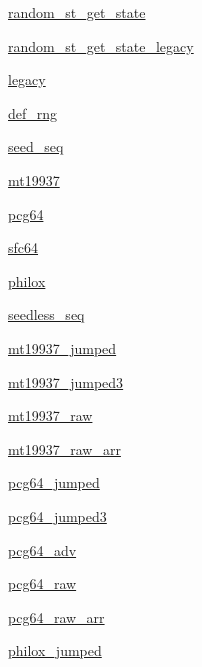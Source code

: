 \begin{DoxyCompactItemize}
\item 
\hyperlink{namespacerandom_a240e2a282437f5bcaeb580df759c2451}{random\+\_\+st\+\_\+get\+\_\+state}
\item 
\hyperlink{namespacerandom_a084d4490674bf3b4e3980d24339d6994}{random\+\_\+st\+\_\+get\+\_\+state\+\_\+legacy}
\item 
\hyperlink{namespacerandom_acca054ac4cb341e38dce9c91e10fac49}{legacy}
\item 
\hyperlink{namespacerandom_a2c6973fc8c41fc3646745e5e16263e4b}{def\+\_\+rng}
\item 
\hyperlink{namespacerandom_a53e5e0b7366478de3058145611394a8b}{seed\+\_\+seq}
\item 
\hyperlink{namespacerandom_a0777bc6c21283c441cb1858bfe4ecf28}{mt19937}
\item 
\hyperlink{namespacerandom_afcbd7077f7344f9877ffbbd240088a77}{pcg64}
\item 
\hyperlink{namespacerandom_a4b3350dab2d10b7d042c16b7aa6ebe3c}{sfc64}
\item 
\hyperlink{namespacerandom_af505a9bae2a12db42fd6d090060f95ec}{philox}
\item 
\hyperlink{namespacerandom_ae352783c2bc04ebb76aea7079b6a2aba}{seedless\+\_\+seq}
\item 
\hyperlink{namespacerandom_a1337e9e892eab3e329c261fc00954c64}{mt19937\+\_\+jumped}
\item 
\hyperlink{namespacerandom_aee15bb7e69f423276cf72f5d2825ba3a}{mt19937\+\_\+jumped3}
\item 
\hyperlink{namespacerandom_a385d34c7fec4dde83fdcc3656abfde1c}{mt19937\+\_\+raw}
\item 
\hyperlink{namespacerandom_a1776917d67c565681144f918c4d25c02}{mt19937\+\_\+raw\+\_\+arr}
\item 
\hyperlink{namespacerandom_ad09c18ff6eb02d4e057dba8b0241c1ee}{pcg64\+\_\+jumped}
\item 
\hyperlink{namespacerandom_af946b7b001c5ea6b132cf0f2c3617ec3}{pcg64\+\_\+jumped3}
\item 
\hyperlink{namespacerandom_ade9d4718812a180e624eba3ee5be8820}{pcg64\+\_\+adv}
\item 
\hyperlink{namespacerandom_afaa4f3db64aaf054d28aa12c866e152c}{pcg64\+\_\+raw}
\item 
\hyperlink{namespacerandom_a0160040bbf3db29f9ab76883f2c5c9c6}{pcg64\+\_\+raw\+\_\+arr}
\item 
\hyperlink{namespacerandom_a26aed140da852d137857325abd6ca1a4}{philox\+\_\+jumped}
\item 

\end{DoxyCompactItemize}
